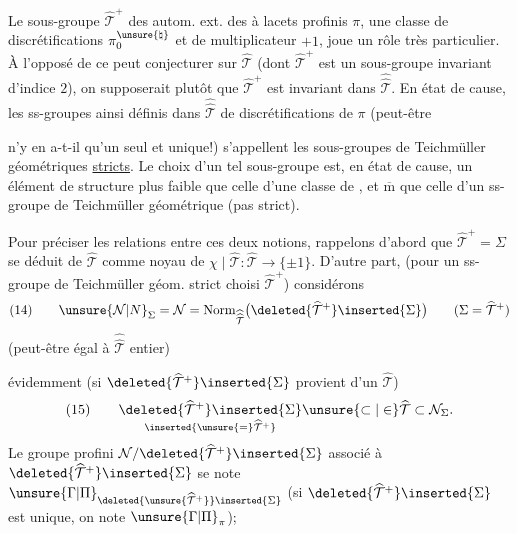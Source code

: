 Le sous-groupe $\widehat{\mathcal{T}}^{+}$ des autom. ext. des
 à lacets profinis $\pi$,
 une classe de discrétifications
$\pi_0^{\unsure{\natural}}$ et de multiplicateur $+1$, joue un rôle très particulier.
À l'opposé de ce  peut conjecturer sur $\widehat{\mathcal{T}}$
(dont $\widehat{\mathcal{T}}^{+}$ est un sous-groupe invariant d'indice $2$),
on supposerait plutôt que $\widehat{\mathcal{T}}^{+}$ est invariant dans
$\widehat{\widehat{\mathcal{T}}}$. En  état de cause,
les ss-groupes ainsi définis dans $\widehat{\widehat{\mathcal{T}}}$
  de discrétifications de $\pi$
 (peut-être



n'y en a-t-il qu'un seul et unique!) s'appellent les sous-groupes de Teichmüller géométriques \uline{stricts}. Le choix d'un tel sous-groupe  est, en  état de cause, un élément de structure  plus faible que celle d'une classe de , et $\overline{\mathrm m}$ que celle d'un ss-groupe de Teichmüller géométrique (pas strict).

Pour préciser les relations entre ces deux notions, rappelons d'abord que $\widehat{\mathcal{T}}^{+}=\Sigma$ se déduit de $\widehat{\mathcal{T}}$ comme noyau de $\chi\mid\widehat{\mathcal{T}}:\widehat{\mathcal{T}}\longrightarrow\{\pm1\}$. D'autre part,  (pour un ss-groupe de Teichmüller géom. strict choisi $\widehat{\mathcal{T}}^{+}$) considérons
\[
(14)\qquad
\unsure{\mathcal{N}|N}_{\Sigma}=\mathcal{N}
=\operatorname{Norm}_{\widehat{\widehat{\mathcal{T}}}}
\bigl(\deleted{\widehat{\mathcal{T}}^{+}}\inserted{\Sigma}\bigr)
\qquad (\Sigma=\widehat{\mathcal{T}}^{+})
\]
(peut-être  égal à $\widehat{\widehat{\mathcal{T}}}$  entier)

évidemment (si $\deleted{\widehat{\mathcal{T}}^{+}}\inserted{\Sigma}$ provient d'un $\widehat{\mathcal{T}}$)
\[
(15)\qquad
\underset{\inserted{\unsure{=}\widehat{\mathcal{T}}^{+}}}
{\deleted{\widehat{\mathcal{T}}^{+}}\inserted{\Sigma}}
\unsure{\subset|\in}\widehat{\mathcal{T}}\subset\mathcal{N}_{\Sigma}.
\]
Le groupe profini $\mathcal{N}/\deleted{\widehat{\mathcal{T}}^{+}}\inserted{\Sigma}$
 associé à 
$\deleted{\widehat{\mathcal{T}}^{+}}\inserted{\Sigma}$ se note
$\unsure{\Gamma|\Pi}_{\deleted{\unsure{\widehat{\mathcal{T}}^{+}}}\inserted{\Sigma}}$
 
(si $\deleted{\widehat{\mathcal{T}}^{+}}\inserted{\Sigma}$ est unique, on note $\unsure{\Gamma|\Pi}_{\pi}$);

